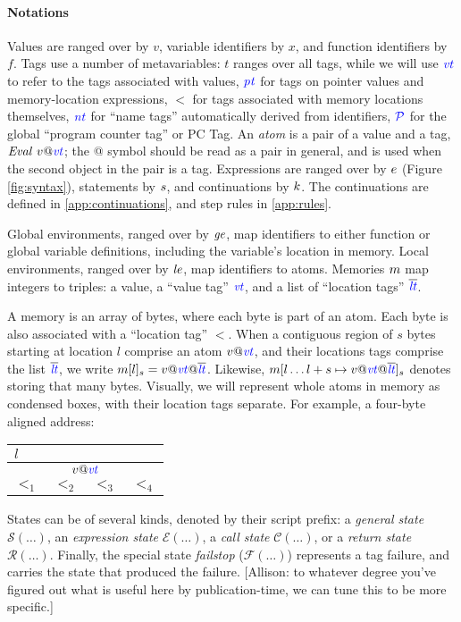 \documentclass{llncs}
\begin{document}
\paragraph{Notations}
\label{sec:semantics}

Values are ranged over by \(v\), variable identifiers by \(x\), and function identifiers by \(f\).
Tags use a number of metavariables: \(t\) ranges over all tags, while we will use
\(\mathit{\color{blue} vt}\) to refer to the tags associated with values, \(\mathit{\color{blue} pt}\) for tags on pointer values
and memory-location expressions, \(\lt\) for tags associated with memory locations themselves,
\(\mathit{\color{blue} nt}\) for ``name tags'' automatically derived from identifiers, \(\mathcal{\color{blue} P}\) for the
global ``program counter tag'' or PC Tag.
An {\it atom} is a pair of a value and a tag, \(\mathit{Eval} ~ v@\mathit{\color{blue} vt}\); the @ symbol should be read
as a pair in general, and is used when the second object in the pair is a tag.
Expressions are ranged over by \(e\) (Figure \ref{fig:syntax}),
statements by \(s\), and continuations by \(k\).
The continuations are defined in \cref{app:continuations}, and step rules in \cref{app:rules}.

Global environments, ranged over by \(\mathit{ge}\), map identifiers to either function
or global variable definitions, including the variable's location in memory. Local environments,
ranged over by \(\mathit{le}\), map identifiers to atoms.
Memories \(m\) map integers to
triples: a value, a ``value tag'' \(\mathit{\color{blue} vt}\), and a list of ``location tags'' \(\overline{\color{blue} \mathit{\color{blue} lt}}\).

A memory is an array of bytes, where each byte is part of an atom.
Each byte is also associated with a ``location tag'' \(\lt\). When a contiguous region of \(s\) bytes
starting at location \(l\) comprise an atom \(v@\mathit{\color{blue} vt}\), and their locations tags comprise the list \(\overline{\color{blue} \mathit{\color{blue} lt}}\),
we write \(m[l]_s = v@\mathit{\color{blue} vt} @\overline{\color{blue} \mathit{\color{blue} lt}}\). Likewise, \(m[l \dots l + s \mapsto v@\mathit{\color{blue} vt} @ \overline{\color{blue} \mathit{\color{blue} lt}}]_s\)
denotes storing that many bytes. Visually, we will represent whole atoms in memory as condensed boxes,
with their location tags separate. For example, a four-byte aligned address:

\begin{tabular}{|c|c|c|c|}
  \multicolumn{4}{l}{\(l\)} \\
  \hline
  \multicolumn{4}{|c|}{\(v @ \mathit{\color{blue} vt}\)} \\
  \hline
  \(\lt_1\) & \(\lt_2\) & \(\lt_3\) & \(\lt_4\) \\
  \hline
\end{tabular}

States can be of several kinds, denoted by their script prefix: a {\em general state} \(\mathcal{S}(\dots)\),
an {\em expression state} \(\mathcal{E}(\dots)\), a {\em call state} \(\mathcal{C}(\dots)\), or a
{\em return state} \(\mathcal{R}(\dots)\). Finally, the special state {\em failstop} (\(\mathcal{F}(\dots)\))
represents a tag failure, and carries the state that produced the failure.
[Allison: to whatever degree you've figured out what is useful here by publication-time, we can
  tune this to be more specific.]
\end{document}
